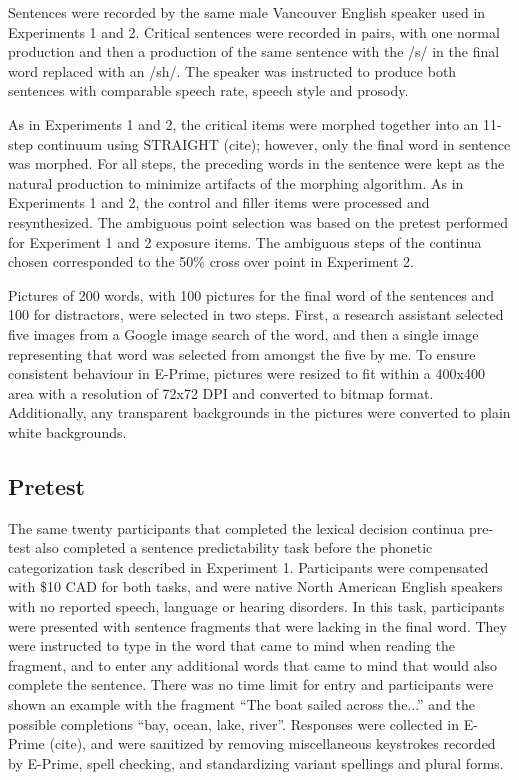Sentences were recorded by the same male Vancouver English speaker used in Experiments 1 and 2.  Critical sentences were recorded in pairs, with one normal production and then a production of the same sentence with the /s/ in the final word replaced with an /sh/.  The speaker was instructed to produce both sentences with comparable speech rate, speech style and prosody.

As in Experiments 1 and 2, the critical items were morphed together into an 11-step continuum using STRAIGHT (cite); however, only the final word in sentence was morphed.  For all steps, the preceding words in the sentence were kept as the natural production to minimize artifacts of the morphing algorithm.  As in Experiments 1 and 2, the control and filler items were processed and resynthesized.  The ambiguous point selection was based on the pretest performed for Experiment 1 and 2 exposure items.  The ambiguous steps of the continua chosen corresponded to the 50\% cross over point in Experiment 2.

Pictures of 200 words, with 100 pictures for the final word of the sentences and 100 for distractors, were selected in two steps.  First, a research assistant selected five images from a Google image search of the word, and then a single image representing that word was selected from amongst the five by me.  To ensure consistent behaviour in E-Prime, pictures were resized to fit within a 400x400 area with a resolution of 72x72 DPI and converted to bitmap format.  Additionally, any transparent backgrounds in the pictures were converted to plain white backgrounds.

\subsection{Pretest}

The same twenty participants that completed the lexical decision continua pre-test also completed a sentence predictability task before the phonetic categorization task described in Experiment 1. Participants were compensated with \$10 CAD for both tasks, and were native North American English speakers with no reported speech, language or hearing disorders. In this task, participants were presented with sentence fragments that were lacking in the final word.  They were instructed to type in the word that came to mind when reading the fragment, and to enter any additional words that came to mind that would also complete the sentence.  There was no time limit for entry and participants were shown an example with the fragment ``The boat sailed across the...'' and the possible completions ``bay, ocean, lake, river''.  Responses were collected in E-Prime (cite), and were sanitized by removing miscellaneous keystrokes recorded by E-Prime, spell checking, and standardizing variant spellings and plural forms.

